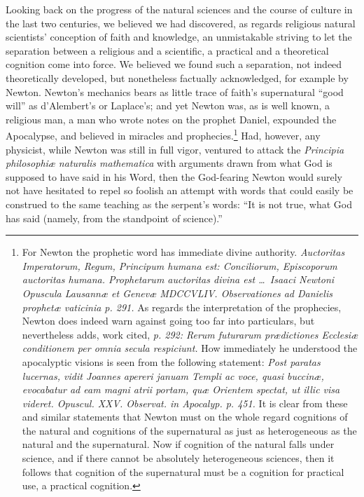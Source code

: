 \documentclass[12pt]{book}
\newcommand{\opage}[1]{\marginnote{\footnotesize\textit{[#1]}}}
\begin{document}
Looking back on the progress of the natural sciences and the course of culture in the last two centuries, we believed we had discovered, as regards religious natural scientists' conception of faith and knowledge, an unmistakable striving to let the separation between a religious and a scientific, a practical and a theoretical cognition come into force. We believed we found such a separation, not indeed theoretically developed, but nonetheless factually acknowledged, for example by Newton. Newton's mechanics bears as little trace of faith's supernatural ``good will'' as d'Alembert's or Laplace's; and yet Newton was, as is well known, a religious man, a man who wrote notes on the prophet Daniel, expounded the Apocalypse, and believed in miracles and prophecies.\footnote{For Newton the prophetic word has immediate divine authority. \textit{Auctoritas Imperatorum, Regum, Principum humana est: Conciliorum, Episcoporum auctoritas humana. Prophetarum auctoritas divina est \dots\ Isaaci Newtoni Opuscula Lausannæ et Genevæ MDCCVLIV. Observationes ad Danielis prophetæ vaticinia p. 291.} As regards the interpretation of the prophecies, Newton does indeed warn against going too far into particulars, but nevertheless adds, work cited, \textit{p. 292: Rerum futurarum prædictiones Ecclesiæ conditionem per omnia secula respiciunt.} How immediately he understood the apocalyptic visions is seen from the following statement: \textit{Post paratas lucernas, vidit Joannes apereri januam Templi ac voce, quasi buccinæ, evocabatur ad eam magni atrii portam, quæ Orientem spectat, ut illic visa videret. Opuscul. XXV. Observat. in Apocalyp. p. 451.} It is clear from these and similar statements that Newton must on the whole regard cognitions of the natural and cognitions of the supernatural as just as heterogeneous as the natural and the supernatural. Now if cognition of the natural falls under science, and if there cannot be absolutely heterogeneous sciences, then it follows that cognition of the supernatural must be a cognition for practical use, a practical cognition.} Had,
\opage{26}\setcounter{footnote}{0}%
however, any physicist, while Newton was still in full vigor, ventured to attack the \textit{Principia philosophiæ naturalis mathematica} with arguments drawn from what God is supposed to have said in his Word, then the God-fearing Newton would surely not have hesitated to repel so foolish an attempt with words that could easily be construed to the same teaching as the serpent's words: ``It is not true, what God has said (namely, from the standpoint of science).''
\end{document}
